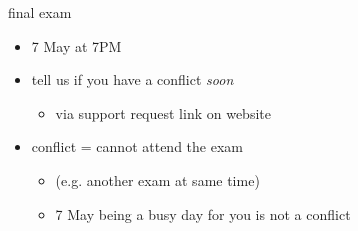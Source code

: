 \begin{frame}{final exam}
    \begin{itemize}
    \item 7 May at 7PM
    \item tell us if you have a conflict \textit{soon}
        \begin{itemize}
        \item via support request link on website
        \end{itemize}
    \item conflict = cannot attend the exam
        \begin{itemize}
        \item (e.g. another exam at same time)
        \item 7 May being a busy day for you is not a conflict
        \end{itemize}
    \end{itemize}
\end{frame}
